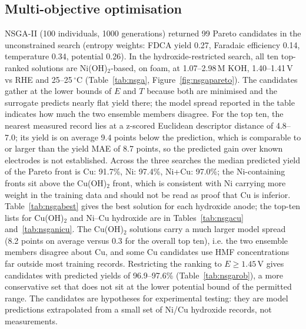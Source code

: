 \documentclass[11pt,a4paper]{article}
\begin{document}
\subsection{Multi-objective optimisation}
NSGA-II (100 individuals, 1000 generations) returned 99 Pareto candidates in the unconstrained search (entropy weights: FDCA yield 0.27, Faradaic efficiency 0.14, temperature 0.34, potential 0.26). In the hydroxide-restricted search, all ten top-ranked solutions are Ni(OH)$_2$-based, on foam, at 1.07--2.98\,M KOH, 1.40--1.41\,V vs RHE and 25--25\,$^\circ$C (Table~\ref{tab:nsga}, Figure~\ref{fig:nsgapareto}). The candidates gather at the lower bounds of $E$ and $T$ because both are minimised and the surrogate predicts nearly flat yield there; the model spread reported in the table indicates how much the two ensemble members disagree. For the top ten, the nearest measured record lies at a z-scored Euclidean descriptor distance of 4.8--7.0; its yield is on average 9.4 points below the prediction, which is comparable to or larger than the yield MAE of 8.7 points, so the predicted gain over known electrodes is not established.  Across the three searches the median predicted yield of the Pareto front is Cu: 91.7\%, Ni: 97.4\%, Ni+Cu: 97.0\%; the Ni-containing fronts sit above the Cu(OH)$_2$ front, which is consistent with Ni carrying more weight in the training data and should not be read as proof that Cu is inferior. Table~\ref{tab:nsgabest} gives the best solution for each hydroxide anode; the top-ten lists for Cu(OH)$_2$ and Ni--Cu hydroxide are in Tables~\ref{tab:nsgacu} and~\ref{tab:nsganicu}. The Cu(OH)$_2$ solutions carry a much larger model spread (8.2 points on average versus 0.3 for the overall top ten), i.e. the two ensemble members disagree about Cu, and some Cu candidates use HMF concentrations far outside most training records. Restricting the ranking to $E\geq1.45$\,V gives candidates with predicted yields of 96.9--97.6\% (Table~\ref{tab:nsgarob}), a more conservative set that does not sit at the lower potential bound of the permitted range. The candidates are hypotheses for experimental testing: they are model predictions extrapolated from a small set of Ni/Cu hydroxide records, not measurements.
\end{document}
